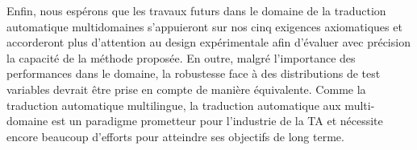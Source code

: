 Enfin, nous espérons que les travaux futurs dans le domaine de la traduction automatique multidomaines s'appuieront sur nos cinq exigences axiomatiques et accorderont plus d'attention au design expérimentale afin d'évaluer avec précision la capacité de la méthode proposée. En outre, malgré l'importance des performances dans le domaine, la robustesse face à des distributions de test variables devrait être prise en compte de manière équivalente. Comme la traduction automatique multilingue, la traduction automatique aux multi-domaine est un paradigme prometteur pour l'industrie de la TA et nécessite encore beaucoup d'efforts pour atteindre ses objectifs de long terme.

\afterpage{\null\newpage}